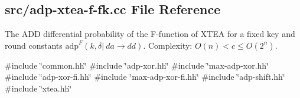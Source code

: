 \hypertarget{adp-xtea-f-fk_8cc}{\subsection{src/adp-\/xtea-\/f-\/fk.cc \-File \-Reference}
\label{adp-xtea-f-fk_8cc}
}


\-The \-A\-D\-D differential probability of the \-F-\/function of \-X\-T\-E\-A for a fixed key and round constants $\mathrm{adp}^{F}(k, \delta |~ da \rightarrow dd)$. \-Complexity\-: $ O(n) < c \le O(2^n) $.  


{\ttfamily \#include \char`\"{}common.\-hh\char`\"{}}\*
{\ttfamily \#include \char`\"{}adp-\/xor.\-hh\char`\"{}}\*
{\ttfamily \#include \char`\"{}max-\/adp-\/xor.\-hh\char`\"{}}\*
{\ttfamily \#include \char`\"{}adp-\/xor-\/fi.\-hh\char`\"{}}\*
{\ttfamily \#include \char`\"{}max-\/adp-\/xor-\/fi.\-hh\char`\"{}}\*
{\ttfamily \#include \char`\"{}adp-\/shift.\-hh\char`\"{}}\*
{\ttfamily \#include \char`\"{}xtea.\-hh\char`\"{}}\*
